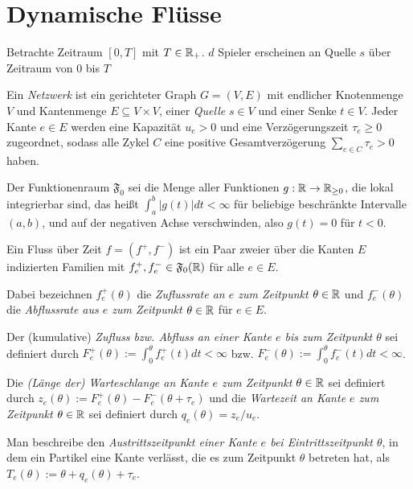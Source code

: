\section{Dynamische Flüsse}

Betrachte Zeitraum $[0,T]$ mit $T\in\mathbb{R}_+$.
$d$ Spieler erscheinen an Quelle $s$ über Zeitraum von $0$ bis $T$

\begin{definition}[Netzwerk]
	Ein \emph{Netzwerk} ist ein gerichteter Graph $G=(V,E)$ mit endlicher Knotenmenge $V$ und Kantenmenge $E\subseteq V\times V$, einer \emph{Quelle} $s\in V$ und einer Senke $t\in V$.
	Jeder Kante $e\in E$ werden eine Kapazität $u_e > 0$ und eine Verzögerungszeit $\tau_e\geq 0$ zugeordnet, sodass alle Zykel $C$ eine positive Gesamtverzögerung $\sum_{e\in C}\tau_e > 0$ haben.
\end{definition}


\begin{definition}
	Der Funktionenraum $\mathfrak{F}_0$ sei die Menge aller Funktionen $g: \mathbb{R} \to \mathbb{R}_{\geq 0}$, die lokal integrierbar sind, das heißt $\int_a^b |g(t)| dt< \infty$ für beliebige beschränkte Intervalle $(a,b)$, und auf der negativen Achse verschwinden, also $g(t)=0$ für $t<0$.
\end{definition}

\begin{definition}
	Ein Fluss über Zeit $f=(f^+, f^-)$ ist ein Paar zweier über die Kanten $E$ indizierten Familien mit $f^+_e,f^-_e\in\mathfrak F_0(\mathbb{R})$ für alle $e\in E$.
	
	Dabei bezeichnen $f_e^+(\theta)$ die \emph{Zuflussrate an $e$ zum Zeitpunkt $\theta\in\mathbb{R}$} und $f_e^-(\theta)$ die \emph{Abflussrate aus $e$ zum Zeitpunkt $\theta\in\mathbb{R}$} für $e\in E$.
	
	Der (kumulative) \emph{Zufluss bzw. Abfluss an einer Kante $e$ bis zum Zeitpunkt $\theta$} sei definiert durch $F^+_e(\theta):=\int_0^\theta f^+_e(t) dt<\infty$ bzw. $F^-_e(\theta):=\int_0^\theta f^-_e(t) dt<\infty$.
	
	Die \emph{(Länge der) Warteschlange an Kante $e$ zum Zeitpunkt $\theta\in\mathbb{R}$} sei definiert durch $z_e(\theta):= F_e^+(\theta) - F_e^-(\theta + \tau_e)$ und die \emph{Wartezeit an Kante $e$ zum Zeitpunkt $\theta\in\mathbb{R}$} sei definiert durch $q_e(\theta) = z_e / u_e$.
	
	Man beschreibe den \emph{Austrittszeitpunkt einer Kante $e$ bei Eintrittszeitpunkt $\theta$}, in dem ein Partikel eine Kante verlässt, die es zum Zeitpunkt $\theta$ betreten hat, als $T_e(\theta):=\theta + q_e(\theta) + \tau_e$.
\end{definition}

